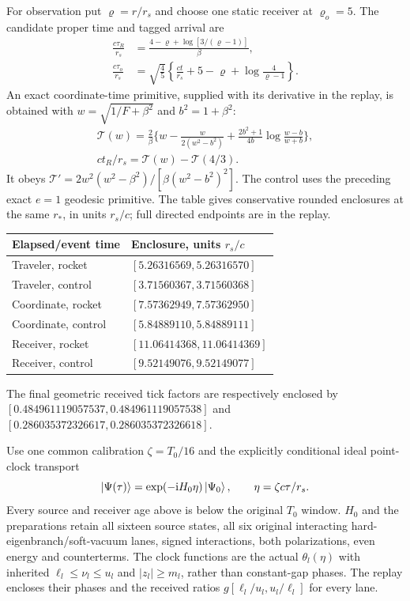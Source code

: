 \documentclass[10pt,twocolumn,letterpaper]{article}
\newcommand{\ii}{\mathrm{i}}
\begin{document}
For observation put $\varrho=r/r_s$ and choose one static receiver at
$\varrho_o=5$. The candidate proper time and tagged arrival are
\begin{equation}
 \begin{split}
 \frac{c\tau_R}{r_s}
   &=\frac{4-\varrho+\log[3/(\varrho-1)]}{\beta},\\
 \frac{c\tau_o}{r_s}
   &=\sqrt{\frac45}\left\{\frac{ct}{r_s}+5-\varrho
                     +\log\frac4{\varrho-1}\right\}.
 \end{split}
\end{equation}
An exact coordinate-time primitive, supplied with its derivative in the
replay, is obtained with $w=\sqrt{1/F+\beta^2}$ and $b^2=1+\beta^2$:
\begin{equation}
 \begin{split}
 \mathcal T(w)=\frac2\beta\bigg\{w-\frac{w}{2(w^2-b^2)}
   +\frac{2b^2+1}{4b}\log\frac{w-b}{w+b}\bigg\},\\
 ct_R/r_s=\mathcal T(w)-\mathcal T(4/3).
 \end{split}
\end{equation}
It obeys $\mathcal T'=2w^2(w^2-\beta^2)/[\beta(w^2-b^2)^2]$.
The control uses the preceding exact $e=1$ geodesic primitive.
The table gives conservative rounded enclosures at the same $r_*$,
in units $r_s/c$; full directed endpoints are in the replay.
\begin{center}\small
\begin{tabular}{@{}ll@{}}
\toprule
Elapsed/event time & Enclosure, units $r_s/c$\\\midrule
Traveler, rocket & $[5.26316569,5.26316570]$\\
Traveler, control & $[3.71560367,3.71560368]$\\
Coordinate, rocket & $[7.57362949,7.57362950]$\\
Coordinate, control & $[5.84889110,5.84889111]$\\
Receiver, rocket & $[11.06414368,11.06414369]$\\
Receiver, control & $[9.52149076,9.52149077]$\\
\bottomrule
\end{tabular}
\end{center}
The final geometric received tick factors are respectively enclosed by
$[0.484961119057537,0.484961119057538]$ and
$[0.286035372326617,0.286035372326618]$.

Use one common calibration $\zeta=T_0/16$ and the explicitly conditional
ideal point-clock transport
\begin{equation}
 \ket{\Psi(\tau)}=\exp(-\ii H_0\eta)\ket{\Psi_0},\qquad
 \eta=\zeta c\tau/r_s .
\end{equation}
Every source and receiver age above is below the original $T_0$ window.
$H_0$ and the preparations retain all sixteen source states, all six
original interacting hard-eigenbranch/soft-vacuum lanes, signed
interactions, both polarizations, even energy and counterterms.
The clock functions are the actual $\theta_l(\eta)$ with inherited
$\ell_l\le\nu_l\le u_l$ and $|z_l|\ge m_l$, rather than constant-gap
phases. The replay encloses their phases and the received ratios
$g[\ell_l/u_l,u_l/\ell_l]$ for every lane.
\end{document}
